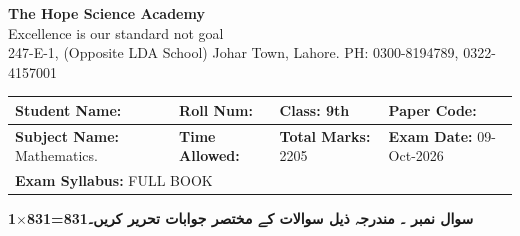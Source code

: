 \documentclass[11pt,a4paper]{article}
\newcommand{\lr}[1]{\beginL #1\endL}
\begin{document}
\begin{center}
  {\Huge\bfseries The Hope Science Academy}\\[3pt]
  {\small Excellence is our standard not goal}\\[2pt]
  {\small 247-E-1, (Opposite LDA School) Johar Town, Lahore. PH: 0300-8194789, 0322-4157001}
\end{center}
\medskip\noindent
\begin{tabularx}{\linewidth}{|X|X|X|X|}
\hline
\textbf{Student Name:} & \textbf{Roll Num:} & \textbf{Class:} 9th & \textbf{Paper Code:} \\ \hline
\textbf{Subject Name:} Mathematics. & \textbf{Time Allowed:} & \textbf{Total Marks:} 2205 & \textbf{Exam Date:} 09-Oct-2026 \\ \hline
\multicolumn{4}{|l|}{\textbf{Exam Syllabus:} FULL BOOK} \\ \hline
\end{tabularx}
\bigskip
\medskip\noindent\textbf{1$\times$831=831}\hfill{\urdufont\beginR\textbf{سوال نمبر \lr{3}۔ مندرجہ ذیل سوالات کے مختصر جوابات تحریر کریں۔}\endR}\par
\end{document}
